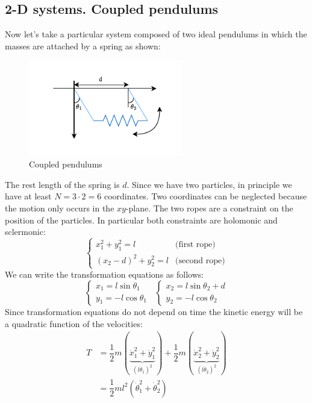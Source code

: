 \subsection{2-D systems. Coupled pendulums}
Now let's take a particular system composed of two ideal pendulums in which the masses are attached by a spring as shown:
\begin{figure}[!ht]
    \centering
    \includegraphics[width=0.6\textwidth]{res/svg/couple_pendulum_1.drawio}
    \caption{Coupled pendulums}
\end{figure}
The rest length of the spring is $d$. Since we have two particles, in principle we have at least $N=3\cdot2=6$ coordinates. Two coordinates can be neglected because the motion only occurs in the $xy$-plane.
The two ropes are a constraint on the position of the particles. In particular both constraints are holomonic and sclermonic:
\begin{equation}
    \begin{cases}
        x_1^2 + y_1^2 = l & \text{(first rope)}\\[8pt]
        (x_2-d)^2 + y_2^2 = l & \text{(second rope)}
    \end{cases}
\end{equation}
We can write the transformation equations as follows:
\begin{equation}
    \begin{cases}
        x_1 = l\sin\theta_1\\[8pt]
        y_1 = -l\cos\theta_1
    \end{cases}\;\;
    \begin{cases}
        x_2 = l\sin\theta_2+d\\[8pt]
        y_2 = -l\cos\theta_2
    \end{cases}
\end{equation}
Since transformation equations do not depend on time the kinetic energy will be a quadratic function of the velocities:
\begin{equation}
    \begin{split}
        T &= \dfrac{1}{2}m(\underbrace{\dot{x}_1^2+\dot{y}_1^2}_{(l\dot{\theta}_1)^2}) + \dfrac{1}{2}m(\underbrace{\dot{x}_2^2+\dot{y}_2^2}_{(l\dot{\theta}_2)^2}) \\[8pt]
        &= \dfrac{1}{2}ml^2(\dot{\theta}_1^2+\dot{\theta}_2^2)
    \end{split}
\end{equation}
